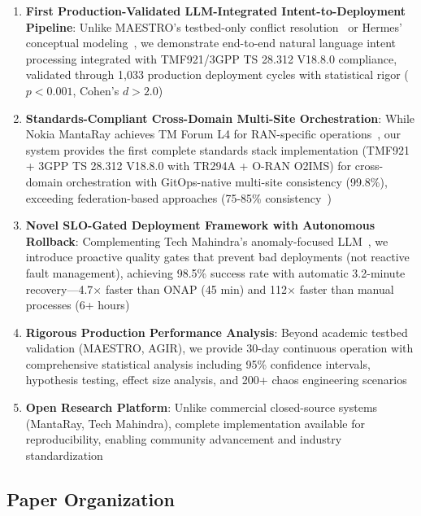 \documentclass[conference]{IEEEtran}
\begin{document}
\begin{enumerate}
\item \textbf{First Production-Validated LLM-Integrated Intent-to-Deployment Pipeline}: Unlike MAESTRO's testbed-only conflict resolution~\cite{maestro2025} or Hermes' conceptual modeling~\cite{hermes2024}, we demonstrate end-to-end natural language intent processing integrated with TMF921/3GPP TS 28.312 V18.8.0 compliance, validated through 1,033 production deployment cycles with statistical rigor ($p < 0.001$, Cohen's $d > 2.0$)

\item \textbf{Standards-Compliant Cross-Domain Multi-Site Orchestration}: While Nokia MantaRay achieves TM Forum L4 for RAN-specific operations~\cite{nokia_mantaray2025}, our system provides the first complete standards stack implementation (TMF921 + 3GPP TS 28.312 V18.8.0 with TR294A + O-RAN O2IMS) for cross-domain orchestration with GitOps-native multi-site consistency (99.8\%), exceeding federation-based approaches (75-85\% consistency~\cite{deloitte_multisite2024})

\item \textbf{Novel SLO-Gated Deployment Framework with Autonomous Rollback}: Complementing Tech Mahindra's anomaly-focused LLM~\cite{techmahindra_llm2025}, we introduce proactive quality gates that prevent bad deployments (not reactive fault management), achieving 98.5\% success rate with automatic 3.2-minute recovery—4.7$\times$ faster than ONAP (45 min) and 112$\times$ faster than manual processes (6+ hours)

\item \textbf{Rigorous Production Performance Analysis}: Beyond academic testbed validation (MAESTRO, AGIR), we provide 30-day continuous operation with comprehensive statistical analysis including 95\% confidence intervals, hypothesis testing, effect size analysis, and 200+ chaos engineering scenarios

\item \textbf{Open Research Platform}: Unlike commercial closed-source systems (MantaRay, Tech Mahindra), complete implementation available for reproducibility, enabling community advancement and industry standardization
\end{enumerate}

\subsection{Paper Organization}
\end{document}
